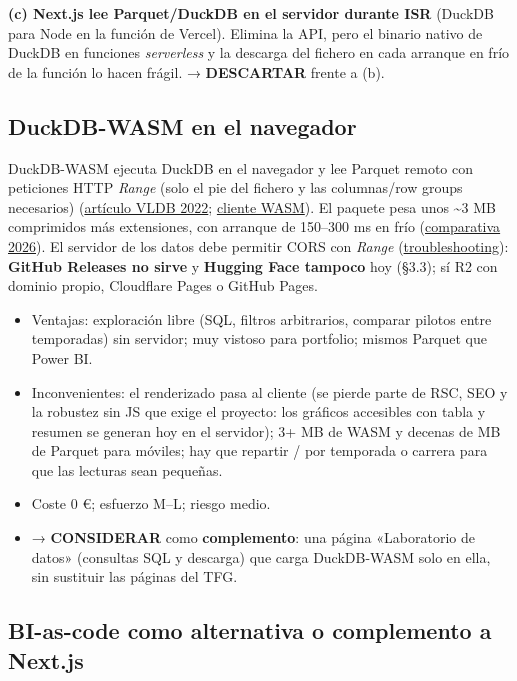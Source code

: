 \textbf{(c) Next.js lee Parquet/DuckDB en el servidor durante ISR} (DuckDB para Node en la función de Vercel). Elimina la API, pero el binario nativo de DuckDB en funciones \emph{serverless} y la descarga del fichero en cada arranque en frío de la función lo hacen frágil. → \textbf{DESCARTAR} frente a (b).

\subsection{DuckDB-WASM en el navegador}

DuckDB-WASM ejecuta DuckDB en el navegador y lee Parquet remoto con peticiones HTTP \emph{Range} (solo el pie del fichero y las columnas/row groups necesarios) (\href{https://www.vldb.org/pvldb/vol15/p3574-kohn.pdf}{artículo VLDB 2022}; \href{https://duckdb.org/docs/current/clients/wasm/overview}{cliente WASM}). El paquete pesa unos \textasciitilde{}3 MB comprimidos más extensiones, con arranque de 150–300 ms en frío (\href{https://kanopylabs.com/blog/pglite-vs-sqlite-wasm-vs-duckdb-wasm}{comparativa 2026}). El servidor de los datos debe permitir CORS con \emph{Range} (\href{https://duckdb.org/docs/current/clients/wasm/troubleshoot}{troubleshooting}): \textbf{GitHub Releases no sirve} y \textbf{Hugging Face tampoco} hoy (§3.3); sí R2 con dominio propio, Cloudflare Pages o GitHub Pages.

\begin{itemize}
\item Ventajas: exploración libre (SQL, filtros arbitrarios, comparar pilotos entre temporadas) sin servidor; muy vistoso para portfolio; mismos Parquet que Power BI.
\item Inconvenientes: el renderizado pasa al cliente (se pierde parte de RSC, SEO y la robustez sin JS que exige el proyecto: los gráficos accesibles con tabla y resumen se generan hoy en el servidor); 3+ MB de WASM y decenas de MB de Parquet para móviles; hay que repartir / por temporada o carrera para que las lecturas sean pequeñas.
\item Coste 0 €; esfuerzo M–L; riesgo medio.
\item → \textbf{CONSIDERAR} como \textbf{complemento}: una página «Laboratorio de datos» (consultas SQL y descarga) que carga DuckDB-WASM solo en ella, sin sustituir las páginas del TFG.
\end{itemize}

\subsection{BI-as-code como alternativa o complemento a Next.js}


